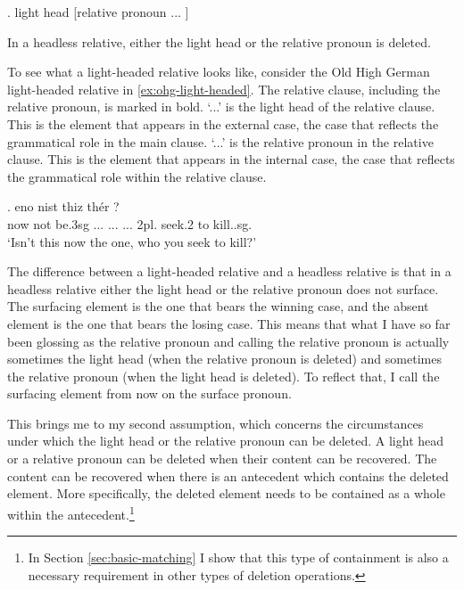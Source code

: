 \ex. light head [relative pronoun ... ]\label{ex:light+rel}

In a headless relative, either the light head or the relative pronoun is deleted.

To see what a light-headed relative looks like, consider the Old High German light-headed relative in \ref{ex:ohg-light-headed}. The relative clause, including the relative pronoun, is marked in bold.
 `...' is the light head of the relative clause. This is the element that appears in the external case, the case that reflects the grammatical role in the main clause.
 `...' is the relative pronoun in the relative clause. This is the element that appears in the internal case, the case that reflects the grammatical role within the relative clause.

\exg. eno nist thiz thér    
 ?\\
 now {not be.3\ac{sg}}\scsub{[nom]} ... ...
 ... 2\ac{pl}. seek.2\scsub{[acc]} to kill..\ac{sg}.\\
 `Isn't this now the one, who you seek to kill?' \label{ex:ohg-light-headed}

The difference between a light-headed relative and a headless relative is that in a headless relative either the light head or the relative pronoun does not surface.
The surfacing element is the one that bears the winning case, and the absent element is the one that bears the losing case. This means that what I have so far been glossing as the relative pronoun and calling the relative pronoun is actually sometimes the light head (when the relative pronoun is deleted) and sometimes the relative pronoun (when the light head is deleted). To reflect that, I call the surfacing element from now on the surface pronoun.

This brings me to my second assumption, which concerns the circumstances under which the light head or the relative pronoun can be deleted. A light head or a relative pronoun can be deleted when their content can be recovered. The content can be recovered when there is an antecedent which contains the deleted element. More specifically, the deleted element needs to be contained as a whole within the antecedent.\footnote{
In Section \ref{sec:basic-matching} I show that this type of containment is also a necessary requirement in other types of deletion operations.
}

